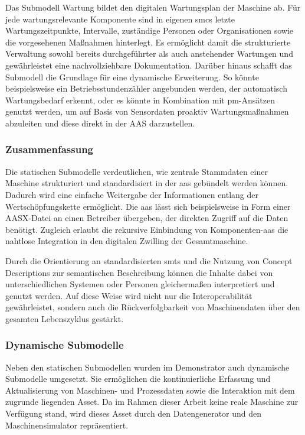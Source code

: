Das Submodell Wartung bildet den digitalen Wartungsplan der Maschine ab. 
Für jede wartungsrelevante Komponente sind in eigenen \acsp{smc} letzte Wartungszeitpunkte, Intervalle, zuständige Personen oder Organisationen sowie die vorgesehenen Maßnahmen hinterlegt. 
Es ermöglicht damit die strukturierte Verwaltung sowohl bereits durchgeführter als auch anstehender Wartungen und gewährleistet eine nachvollziehbare Dokumentation. 
Darüber hinaus schafft das Submodell die Grundlage für eine dynamische Erweiterung. 
So könnte beispielsweise ein Betriebsstundenzähler angebunden werden, der automatisch Wartungsbedarf erkennt, oder es könnte in Kombination mit \acs{pm}-Ansätzen genutzt werden, um auf Basis von Sensordaten proaktiv Wartungsmaßnahmen abzuleiten und diese direkt in der AAS darzustellen. 

\subsubsection*{Zusammenfassung}
\vspace{-0.5em}

Die statischen Submodelle verdeutlichen, wie zentrale Stammdaten einer Maschine strukturiert und standardisiert in der \acs{aas} gebündelt werden können. 
Dadurch wird eine einfache Weitergabe der Informationen entlang der Wertschöpfungskette ermöglicht. 
Die \acs{aas} lässt sich beispielsweise in Form einer AASX-Datei an einen Betreiber übergeben, der direkten Zugriff auf die Daten benötigt.
Zugleich erlaubt die rekursive Einbindung von Komponenten-\acs{aas} die nahtlose Integration in den digitalen Zwilling der Gesamtmaschine. 

Durch die Orientierung an standardisierten \acsp{smt} und die Nutzung von Concept Descriptions zur semantischen Beschreibung können die Inhalte dabei von unterschiedlichen Systemen oder Personen gleichermaßen interpretiert und genutzt werden. 
Auf diese Weise wird nicht nur die Interoperabilität gewährleistet, sondern auch die Rückverfolgbarkeit von Maschinendaten über den gesamten Lebenszyklus gestärkt.

\newpage
\subsubsection{Dynamische Submodelle}
\label{sec:DynamischeSubmodelle}
Neben den statischen Submodellen wurden im Demonstrator auch dynamische Submodelle umgesetzt.
Sie ermöglichen die kontinuierliche Erfassung und Aktualisierung von Maschinen- und Prozessdaten sowie die Interaktion mit dem zugrunde liegenden Asset.
Da im Rahmen dieser Arbeit keine reale Maschine zur Verfügung stand, wird dieses Asset durch den Datengenerator und den Maschinensimulator repräsentiert.

